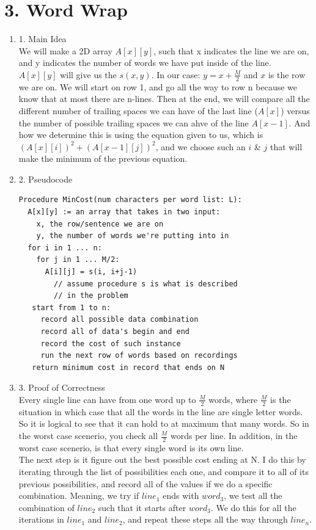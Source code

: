 \documentclass[11pt]{article}
\newenvironment{qparts}{\begin{enumerate}[{(}a{)}]}{\end{enumerate}}
\begin{document}
\newpage
\section*{3. Word Wrap}
\begin{qparts}
\item[1.] Main Idea \\
We will make a 2D array $A[x][y]$, such that x indicates the line we are on, and y indicates the number of words we have put inside of the line. $A[x][y]$ will give us the $s(x,y)$. In our case: $y = x + \frac{M}{2}$ and $x$ is the row we are on. We will start on row 1, and go all the way to row n because we know that at most there are n-lines. Then at the end, we will compare all the different number of trailing spaces we can have of the last line ($A[x]$) versus the number of possible trailing spaces we can ahve of the line $A[x-1]$. And how we determine this is using the equation given to us, which is $(A[x][i])^2 +( A[x-1][j])^{2}$, and we choose such an $i$ \& $j$ that will make the minimum of the previous equation. 

\item[2.] Pseudocode 
\begin{verbatim}
Procedure MinCost(num characters per word list: L):
  A[x][y] := an array that takes in two input:
    x, the row/sentence we are on
    y, the number of words we're putting into in
  for i in 1 ... n:
    for j in 1 ... M/2:
      A[i][j] = s(i, i+j-1) 
        // assume procedure s is what is described
        // in the problem
   start from 1 to n:
     record all possible data combination
     record all of data's begin and end
     record the cost of such instance
     run the next row of words based on recordings
   return minimum cost in record that ends on N
\end{verbatim}

\item[3.] Proof of Correctness \\
Every single line can have from one word up to $\frac{M}{2}$ words, where $\frac{M}{2}$ is the situation in which case that all the words in the line are single letter words. So it is logical to see that it can hold to at maximum that many words. So in the worst case scenerio, you check all $\frac{M}{2}$ words per line. In addition, in the worst case scenerio, is that every single word is its own line. \\

The next step is it figure out the best possible cost ending at N. I do this by iterating through the list of possibilities each one, and compare it to all of its previous possibilities, and record all of the values if we do a specific combination. Meaning, we try if $line_1$ ends with $word_3$, we test all the combination of $line_2$ such that it starts after $word_3$. We do this for all the iterations in $line_1$ and $line_2$, and repeat these steps all the way through $line_n$. \\


\end{qparts}
\end{document}
